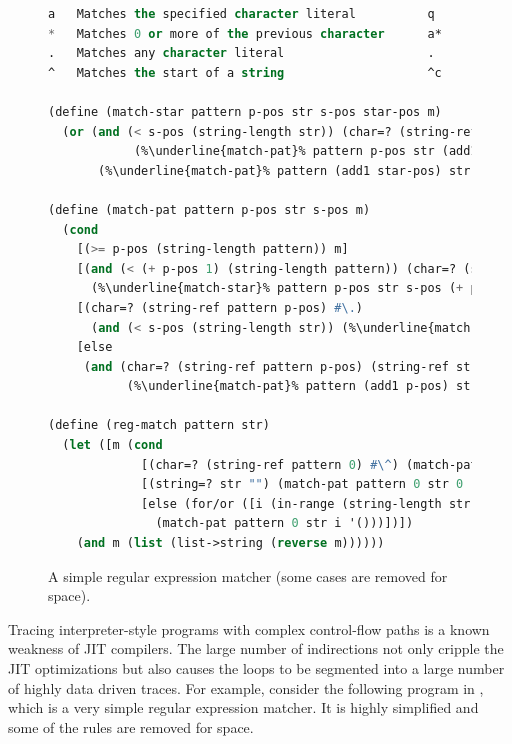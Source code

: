 \begin{figure}[h!]
  \footnotesize
  \begin{mdframed}
\begin{lstlisting}[mathescape,escapechar=\%,language=lisp]
a 	Matches the specified character literal          q       q
* 	Matches 0 or more of the previous character      a*      "", a, aa, aaa
. 	Matches any character literal                    .       a, b, c, d, e ...
^ 	Matches the start of a string                    ^c      c, ca, caa, cbb ...

(define (match-star pattern p-pos str s-pos star-pos m)
  (or (and (< s-pos (string-length str)) (char=? (string-ref pattern p-pos) (string-ref str s-pos))
            (%\underline{match-pat}% pattern p-pos str (add1 s-pos) (cons (string-ref str s-pos) m)))
       (%\underline{match-pat}% pattern (add1 star-pos) str s-pos m)))

(define (match-pat pattern p-pos str s-pos m)
  (cond
    [(>= p-pos (string-length pattern)) m]
    [(and (< (+ p-pos 1) (string-length pattern)) (char=? (string-ref pattern (+ p-pos 1)) #\*))
      (%\underline{match-star}% pattern p-pos str s-pos (+ p-pos 1) m)]
    [(char=? (string-ref pattern p-pos) #\.)
      (and (< s-pos (string-length str)) (%\underline{match-pat}% pattern (add1 p-pos) str (add1 s-pos) (cons (string-ref str s-pos) m)))]
    [else
     (and (char=? (string-ref pattern p-pos) (string-ref str s-pos))
           (%\underline{match-pat}% pattern (add1 p-pos) str (add1 s-pos) (cons (string-ref str s-pos) m)))]))

(define (reg-match pattern str)
  (let ([m (cond
             [(char=? (string-ref pattern 0) #\^) (match-pat pattern 1 str 0 '())]
             [(string=? str "") (match-pat pattern 0 str 0 '())] ; edge case
             [else (for/or ([i (in-range (string-length str))])
               (match-pat pattern 0 str i '()))])])
    (and m (list (list->string (reverse m))))))
\end{lstlisting}
\end{mdframed}
\caption{A simple regular expression matcher (some cases are removed for space).}
\label{fig:regexp}
\vspace{-0.3cm}
\end{figure}

Tracing interpreter-style programs with complex control-flow paths is
a known weakness of JIT compilers. The large number of indirections
not only cripple the JIT optimizations but also causes the loops to be
segmented into a large number of highly data driven traces. For
example, consider the following program in , which
is a very simple regular expression matcher. It is highly simplified
and some of the rules are removed for space.

